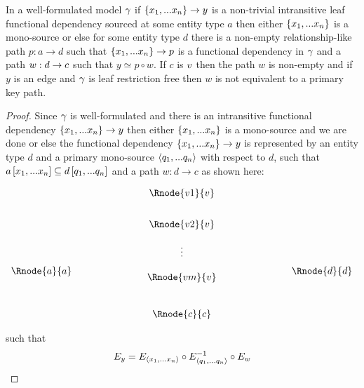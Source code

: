 \begin{lemma}
In a well-formulated model $\gamma$  if $\left\{x_1,...x_n\right\} \rightarrow y$  is a non-trivial intransitive leaf
functional dependency sourced at some entity type $a$ then either $\left\{x_1,...x_n\right\}$ is a mono-source
or else for some entity type $d$ there is a non-empty relationship-like path $p:a \rightarrow d$ such that $\{x_1,...x_n\} \rightarrow p$ is a functional dependency in $\gamma$
and a  path $w:d \rightarrow c$  such that $y \simeq p \circ w$. If $c$ is $v$ then
the path $w$ is non-empty and if $y$ is an edge and $\gamma$ is leaf restriction free then $w$ is not equivalent to a primary key path.
\end{lemma}
\begin{proof}
Since $\gamma$ is well-formulated  and there is an intransitive functional dependency $\left\{x_1,...x_n\right\} \rightarrow y$ then either $\left\{x_1,...x_n\right\}$ is a mono-source and we are done or else the functional dependency
$\left\{x_1,...x_n\right\} \rightarrow y$   is represented 
by  an entity type $d$ and 
a primary mono-source $\langle q_1,...q_n\rangle$ with respect to
$d$, such that $a\left[x_1,...x_n\right]\subseteq d\left[q_1,...q_n\right]$ and a 
path $w:d\rightarrow c$ as shown here:

\setlength{\arraycolsep}{.2cm}
\begin{center}
$
\begin{array}{cp{2cm}c p{2cm} c}
             &  & \Rnode{v1}{\veee} & &               \\ [0.7cm]
						 &  & \Rnode{v2}{\veee} & &               \\ [0.4cm]
						 &  &     \vdots      & &               \\ [0.2cm]
\Rnode{a}{a} &  &                 & & \Rnode{d}{d}  \\ [-0.2cm]
             &  & \Rnode{vm}{\veee} & &               \\ [0.9cm]
             &  & \Rnode{c}{c}    & &               \\
\end{array}
$
\end{center}
such that
\begin{equation}
\label{fundependency}
E_y = E_{\langle x_1,...x_n\rangle} \circ E_{\langle q_1,...q_n\rangle}^{-1} \circ E_w
\end{equation}


\end{proof}
